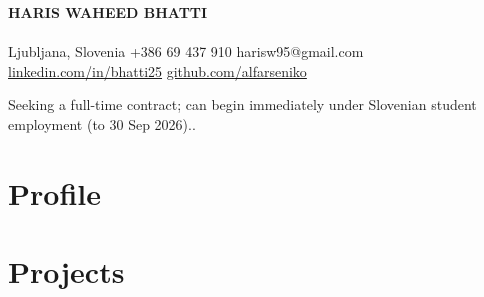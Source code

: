 \documentclass[a4paper,10.5pt]{article}
\newif\ifDEV \newif\ifCOORD \newif\ifRND
\newcommand{\datefill}{\dotfill}
\newcommand{\entry}[3]{\vspace{2.5pt}\noindent\textbf{#1} \textbar{} #2 \datefill{} #3\par\vspace{0.5pt}}
\newcommand{\projIfcToNeo}{%
\entry{ifctoneo4j -- Python package (PyPI)}{Python, IfcOpenShell, Neo4j, Cypher}{2026}
\begin{itemize}
  \item Open-source library converting IFC models (IFC2X3, IFC4, IFC4X3) into Neo4j
        property graphs aligned to Linked Building Data ontologies, with no RDF
        intermediate. Published to PyPI: \texttt{pip install ifctoneo4j}.
\end{itemize}}
\newcommand{\projBIMGraph}{%
\entry{BIMGraphExplorer -- LLM agent for IFC question answering}{Python, MCP, Neo4j}{2026}
\begin{itemize}
  \item Adaptive querying system exposing four read-only tools over the Model
        Context Protocol; profiles the graph schema and issues iterative Cypher
        queries conditioned on prior results.
  \item Raised answer accuracy by 33 percentage points and source transparency from
        12.5\% to 99.7\% on a fixed model and dataset, through prompt design alone.
  \item Benchmarked against a published direct-IFC baseline under matched
        conditions (same model, same validated judge; 23 IFC datasets, 367
        questions, 15 projects). Overall accuracy 72.0\% against the baseline's
        82.3\%, but reached source-transparency parity (99.7\% versus 100\%) and
        outperformed it on 5 of 23 datasets.
\end{itemize}}
\newcommand{\projGuimaraes}{%
\entry{Federated BIM Model -- Pakistani-Themed Expo, Guimar\~aes}{IFC, Autodesk Construction Cloud}{Oct 2025}
\begin{itemize}
  \item Owned the federated model and clash-detection workflow across architecture
        and MEP disciplines, validated against Employer's Information Requirements
        under ISO 19650.
\end{itemize}}
\newcommand{\projBlockchain}{%
\entry{Blockchain-Based BIM Document Management}{Solidity, Ethereum (Arbitrum Sepolia)}{2024}
\begin{itemize}
  \item Smart contract system to sign and manage construction documents, with
        immutable on-chain linkage, to streamline dispute resolution under FIDIC
        contracts. Funded by a competitive grant from the
        Pakistan Engineering Council.
\end{itemize}}
\begin{document}
\begin{center}
  {\LARGE\bfseries HARIS WAHEED BHATTI}\\[2pt]
  {\large \ROLELINE}\\[3pt]
  Ljubljana, Slovenia \textbar{} +386 69 437 910 \textbar{} harisw95@gmail.com\\
  \href{https://linkedin.com/in/bhatti25}{linkedin.com/in/bhatti25} \textbar{}
  \href{https://github.com/alfarseniko}{github.com/alfarseniko}
\end{center}
\vspace{-4pt}
\noindent\small Seeking a full-time contract; can begin immediately under Slovenian student employment (to 30 Sep 2026)..\normalsize

\section{Profile}
\ifDEV
\noindent Civil engineer with a European Master's in Building Information Modelling
who builds software for the AEC industry -- IFC schemas, graph databases and LLM
agent systems. Author of \texttt{ifctoneo4j}, an open-source IFC-to-Neo4j converter
published on PyPI.
\fi
\ifCOORD
\noindent Civil engineer with a European Master's in Building Information Modelling,
combining ISO 19650 coordination practice with the ability to build the tooling
around it. Delivered a federated multidiscipline model with clash detection and EIR
compliance, and published an open-source IFC-to-Neo4j converter on PyPI.
\fi
\ifRND
\noindent Civil engineer with a European Master's in Building Information Modelling,
working on graph-mediated LLM systems for construction data. Benchmarked a
graph-based IFC question-answering agent against a published baseline across 23
datasets and 367 questions, and published the underlying converter on PyPI.
\fi

\section{Projects}
\ifDEV   \projIfcToNeo \projBIMGraph \projGuimaraes \projBlockchain \fi
\ifCOORD \projGuimaraes \projIfcToNeo \projBIMGraph \projBlockchain \fi
\ifRND   \projBIMGraph \projIfcToNeo \projGuimaraes \projBlockchain \fi
\end{document}
